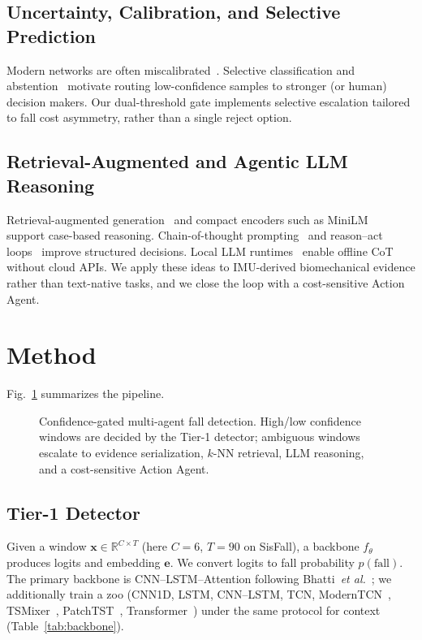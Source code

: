 \documentclass[journal]{IEEEtran}
\begin{document}
\subsection{Uncertainty, Calibration, and Selective Prediction}
Modern networks are often miscalibrated~\cite{guo2017calibration,platt1999probabilistic}. Selective classification and abstention~\cite{el2010foundations,geifman2017selective} motivate routing low-confidence samples to stronger (or human) decision makers. Our dual-threshold gate implements selective escalation tailored to fall cost asymmetry, rather than a single reject option.

\subsection{Retrieval-Augmented and Agentic LLM Reasoning}
Retrieval-augmented generation~\cite{lewis2020rag} and compact encoders such as MiniLM~\cite{minilm2020} support case-based reasoning. Chain-of-thought prompting~\cite{wei2022cot} and reason--act loops~\cite{yao2023react} improve structured decisions. Local LLM runtimes~\cite{ollama,mistral2023,qwen2024} enable offline CoT without cloud APIs. We apply these ideas to IMU-derived biomechanical evidence rather than text-native tasks, and we close the loop with a cost-sensitive Action Agent.

\section{Method}
\label{sec:method}

Fig.~\ref{fig:arch} summarizes the pipeline.

\begin{figure}[!t]
\centering

\caption{Confidence-gated multi-agent fall detection. High/low confidence windows are decided by the Tier-1 detector; ambiguous windows escalate to evidence serialization, $k$-NN retrieval, LLM reasoning, and a cost-sensitive Action Agent.}
\label{fig:arch}
\end{figure}

\subsection{Tier-1 Detector}
Given a window $\mathbf{x}\in\mathbb{R}^{C\times T}$ (here $C{=}6$, $T{=}90$ on SisFall), a backbone $f_\theta$ produces logits and embedding $\mathbf{e}$. We convert logits to fall probability $p(\mathrm{fall})$. The primary backbone is CNN--LSTM--Attention following Bhatti~\textit{et al.}~\cite{bhatti2025beyond}; we additionally train a zoo (CNN1D, LSTM, CNN--LSTM, TCN, ModernTCN~\cite{iglesias2023modern}, TSMixer~\cite{tsmixer2023}, PatchTST~\cite{patchtst2023}, Transformer~\cite{vaswani2017attention}) under the same protocol for context (Table~\ref{tab:backbone}).
\end{document}
